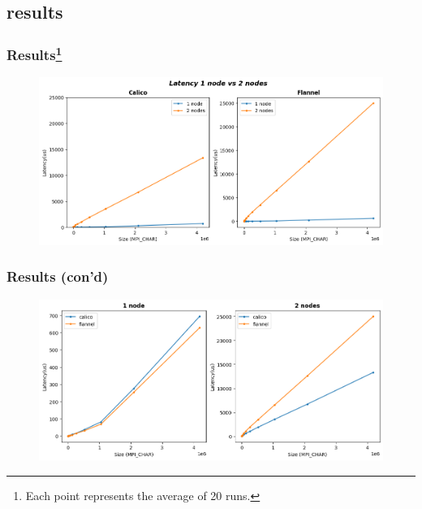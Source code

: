 \documentclass{beamer}
\begin{document}
\begin{frame}
\begin{columns}
\begin{figure}
        \end{figure}
    \end{columns}
\end{frame}

\subsection{results}
\begin{frame}
    \frametitle{Results\footnote{Each point represents the average of 20 runs.}}
    \begin{figure}
        \includegraphics[width=\textwidth]{images/other/calico_flannel_plot}
    \end{figure}
\end{frame}

\begin{frame}
    \frametitle{Results (con'd)}
    \begin{figure}
        \includegraphics[width=\textwidth]{images/other/one_two_node}
    \end{figure}
\end{frame}
\end{document}
